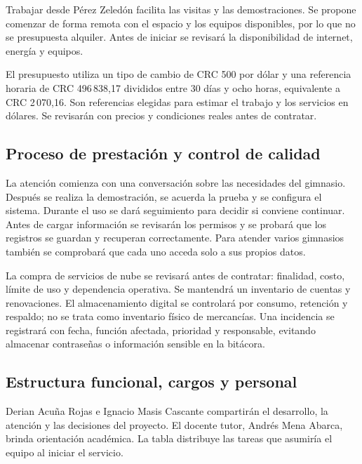 Trabajar desde Pérez Zeledón facilita las visitas y las demostraciones.
Se propone comenzar de forma remota con el espacio y los equipos disponibles,
por lo que no se presupuesta alquiler. Antes de iniciar se revisará la
disponibilidad de internet, energía y equipos.

El presupuesto utiliza un tipo de cambio de CRC 500 por dólar y una referencia
horaria de CRC 496\,838,17 divididos entre 30 días y ocho horas, equivalente a
CRC 2\,070,16. Son referencias elegidas para estimar el trabajo y los servicios
en dólares. Se revisarán con precios y condiciones reales antes de contratar.

\subsection{Proceso de prestación y control de calidad}

La atención comienza con una conversación sobre las necesidades del gimnasio.
Después se realiza la demostración, se acuerda la prueba y se configura el
sistema. Durante el uso se dará seguimiento para decidir si conviene continuar.
Antes de cargar información se revisarán los permisos y se probará que los
registros se guardan y recuperan correctamente. Para atender varios gimnasios
también se comprobará que cada uno acceda solo a sus propios datos.

La compra de servicios de nube se revisará antes de contratar: finalidad,
costo, límite de uso y dependencia operativa. Se mantendrá un inventario de
cuentas y renovaciones. El almacenamiento digital se controlará por consumo,
retención y respaldo; no se trata como inventario físico de mercancías. Una
incidencia se registrará con fecha, función afectada, prioridad y responsable,
evitando almacenar contraseñas o información sensible en la bitácora.

\subsection{Estructura funcional, cargos y personal}

Derian Acuña Rojas e Ignacio Masis Cascante compartirán el desarrollo, la
atención y las decisiones del proyecto. El docente tutor, Andrés Mena Abarca,
brinda orientación académica. La tabla distribuye las tareas que asumiría el
equipo al iniciar el servicio.

